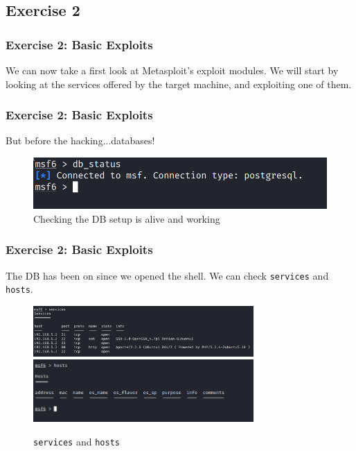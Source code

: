 \documentclass[handout]{beamer}
\begin{document}
\subsection{Exercise 2}

\begin{frame}
	\frametitle{Exercise 2: Basic Exploits}
	We can now take a first look at Metasploit's exploit modules. We will start by looking at the services offered by the target machine, and exploiting one of them.
\end{frame}

\begin{frame}
	\frametitle{Exercise 2: Basic Exploits}
	But before the hacking...databases!
	\begin{figure}
	    \centering
	    \includegraphics[width=\textwidth]{../drawable/exercise_2_screenshots/db_status.png}
	    \caption{Checking the DB setup is alive and working}
	\end{figure}
\end{frame}

\begin{frame}
	\frametitle{Exercise 2: Basic Exploits}
	The DB has been on since we opened the shell. We can check \texttt{services} and \texttt{hosts}.
	
	\begin{figure}
	    \centering
	    \includegraphics[width=0.75\textwidth]{../drawable/exercise_2_screenshots/services_before.png}
	    \includegraphics[width=0.75\textwidth]{../drawable/exercise_2_screenshots/hosts_empty.png}
	    \caption{\texttt{services} and \texttt{hosts}}
	\end{figure}
	
\end{frame}
\end{document}
